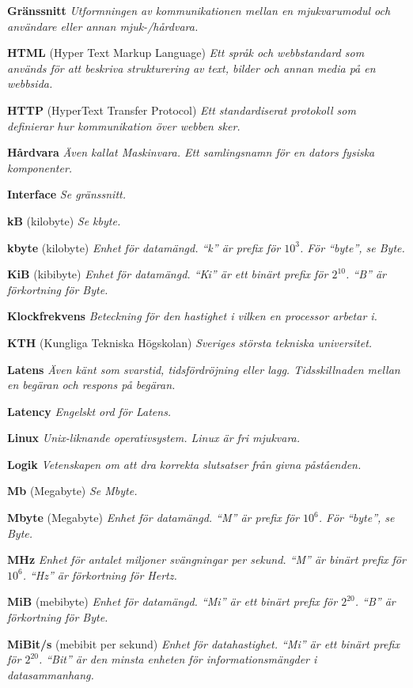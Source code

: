 \documentclass[a4paper, twoside, 11pt, titlepage]{article}
\begin{document}
	\textbf{Gränssnitt} \emph{Utformningen av kommunikationen mellan en mjukvarumodul och användare eller annan mjuk-/hårdvara.}

	\textbf{HTML} (Hyper Text Markup Language) \emph{Ett språk och webbstandard som används för att beskriva strukturering av text, bilder och annan media på en webbsida.}

	\textbf{HTTP} (HyperText Transfer Protocol) \emph{Ett standardiserat protokoll som definierar hur kommunikation över webben sker.}

	\textbf{Hårdvara} \emph{Även kallat Maskinvara. Ett samlingsnamn för en dators fysiska komponenter.}

	\textbf{Interface} \emph{Se gränssnitt.}

	\textbf{kB} (kilobyte) \emph{Se kbyte.}

	\textbf{kbyte} (kilobyte) \emph{Enhet för datamängd. ``k'' är prefix för $10^{3}$. För ``byte'', se Byte.}

	\textbf{KiB} (kibibyte) \emph{Enhet för datamängd. ``Ki'' är ett binärt prefix för $2^{10}$. ``B'' är förkortning för Byte.}

	\textbf{Klockfrekvens} \emph{Beteckning för den hastighet i vilken en processor arbetar i.}

	\textbf{KTH} (Kungliga Tekniska Högskolan) \emph{Sveriges största tekniska universitet.}

	\textbf{Latens} \emph{Även känt som svarstid, tidsfördröjning eller lagg. Tidsskillnaden mellan en begäran och respons på begäran.}

	\textbf{Latency} \emph{Engelskt ord för Latens.}

	\textbf{Linux} \emph{Unix-liknande operativsystem. Linux är fri mjukvara.}

	\textbf{Logik} \emph{Vetenskapen om att dra korrekta slutsatser från givna påståenden.}

	\textbf{Mb} (Megabyte) \emph{Se Mbyte.}

	\textbf{Mbyte} (Megabyte) \emph{Enhet för datamängd. ``M'' är prefix för $10^{6}$.  För ``byte'', se Byte.}

	\textbf{MHz} \emph{Enhet för antalet miljoner svängningar per sekund. ``M'' är binärt prefix för $10^{6}$. ``Hz'' är förkortning för Hertz.}

	\textbf{MiB} (mebibyte) \emph{Enhet för datamängd. ``Mi'' är ett binärt prefix för $2^{20}$. ``B'' är förkortning för Byte.}

	\textbf{MiBit/s} (mebibit per sekund) \emph{Enhet för datahastighet. ``Mi'' är ett binärt prefix för $2^{20}$. ``Bit'' är den minsta enheten för informationsmängder i datasammanhang.}
\end{document}
